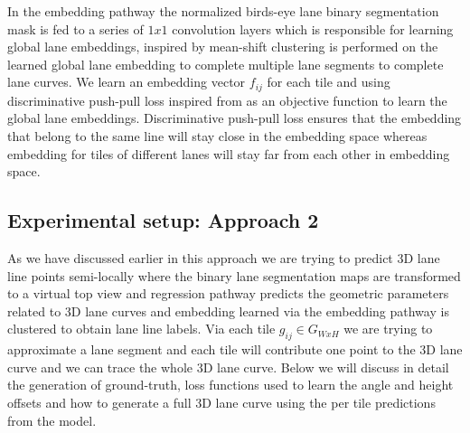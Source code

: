      In the embedding pathway the normalized birds-eye lane binary segmentation mask is fed to a series of $1x1$ convolution layers which is responsible for learning global lane embeddings, inspired by \cite{DBLP:journals/corr/abs-1802-05591} mean-shift clustering is performed on the learned global lane embedding to complete multiple lane segments to complete lane curves. We learn an embedding vector $f_{ij}$ for each tile and using discriminative push-pull loss inspired from \cite{DBLP:journals/corr/abs-2011-01535} \cite{DBLP:journals/corr/abs-1802-05591} as an objective function to learn the global lane embeddings. Discriminative push-pull loss ensures that the embedding that belong to the same line will stay close in the embedding space whereas embedding for tiles of different lanes will stay far from each other in embedding space. 

    \subsection{Experimental setup: Approach 2}
    As we have discussed earlier in this approach we are trying to predict 3D lane line points semi-locally where the binary lane segmentation maps are transformed to a virtual top view and regression pathway predicts the geometric parameters related to 3D lane curves and embedding learned via the embedding pathway is clustered to obtain lane line labels. Via each tile $g_{ij} \in G_{WxH}$ we are trying to approximate a lane segment and each tile will contribute one point to the 3D lane curve and we can trace the whole 3D lane curve. Below we will discuss in detail the generation of ground-truth, loss functions used to learn the angle and height offsets and how to generate a full 3D lane curve using the per tile predictions from the model. 
